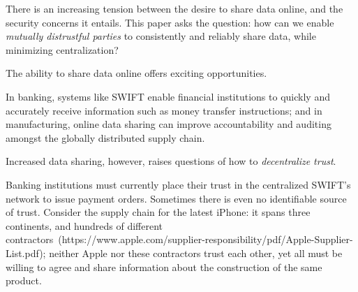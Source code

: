 
There is an increasing tension between the desire to share data online, and the security concerns it entails.
This paper asks the question: how can we enable \textit{mutually distrustful parties} to consistently and reliably
share data, while minimizing centralization?

The ability to share data online offers exciting opportunities.
\iffalse %
In the medical domain, for
instance, cloud-based solutions for managing health record offer doctors increased fault-tolerance at lower
cost, and offer patient an easier path to share their medical
history with their entire treatment teams, even when on the road. Opportunities abound in other areas too.
\fi
In banking, systems like SWIFT enable financial institutions to quickly and accurately receive information
such as money transfer instructions; and in manufacturing, online data sharing can improve accountability
and auditing amongst the globally distributed supply chain.

Increased data sharing, however, raises questions of how to \textit{decentralize trust}.
\iffalse
Even when medical records are
encrypted or anonymized, cloud providers or dishonest applications may be able to acquire
sensitive information: for example, tracking the charts accessed by an oncologist can reveal not only whether
a patient has cancer, but also, depending on the frequency of accesses (e.g., the frequency of chemotherapy
appointments), indicate the cancers type and severity.
\fi
Banking institutions must currently place their trust
in the centralized SWIFT’s network to issue payment orders. Sometimes there is even no identifiable source of
trust. Consider the supply chain for the latest iPhone: it spans three continents, and hundreds of different
contractors~(https://www.apple.com/supplier-responsibility/pdf/Apple-Supplier-List.pdf); neither Apple nor these contractors trust each other, yet all must be willing to agree and share
information about the construction of the same product.


\iffalse %
\Yunhao{If I understand correctly, the medical record example is for privacy,
  the banking and the manufacturing example are for trust.
  I can see how BFT solves the later by decentralizing trust, but I cannot
  see how BFT solves the privacy problem. The access pattern of each transaction is visible to all parties.}
\fi

